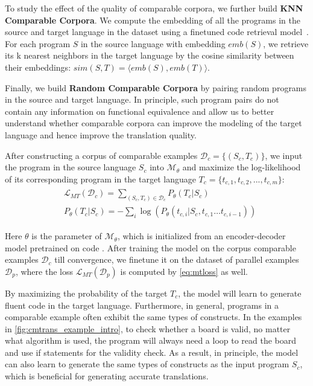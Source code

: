 To study the effect of the quality of comparable corpora, we further build \textbf{KNN Comparable Corpora}.
We compute the embedding of all the programs in the source and target language in the dataset using a finetuned code retrieval model~\cite{codesearchnet}.
For each program $S$ in the source language with embedding $emb(S)$, we retrieve its k nearest neighbors in the target language by the cosine similarity between their embeddings: $sim(S,T) = \langle emb(S), emb(T) \rangle$.

Finally, we build \textbf{Random Comparable Corpora} by pairing random programs in the source and target language.
In principle, such program pairs do not contain any information on functional equivalence and allow us to better understand whether comparable corpora can improve the modeling of the target language and hence improve the translation quality.



After constructing a corpus of comparable examples $\mathcal{D}_c = \{(S_c, T_c)\}$, we input the program in the source language $S_c$ into \cmtransours $\mathcal{M}_{\theta}$ and maximize the log-likelihood of its corresponding program in the target language $T_c = \{t_{c,1}, t_{c,2}, ..., t_{c,m} \}$:
\begin{align}
\begin{split}
&\mathcal{L}_{M T}(\mathcal{D}_c) = \sum_{(S_c, T_c) \in \mathcal{D}_c} P_{\theta}(T_c | S_c) \\
&P_{\theta}(T_c | S_c) = -\sum_i \log \left(P_{\theta}\left(t_{c,i} | S_c, t_{c,1} \ldots t_{c,i-1} \right)\right)
\end{split}
\label{eq:mtloss}
\end{align}

Here $\theta$ is the parameter of $\mathcal{M}_{\theta}$, which is initialized from an encoder-decoder model pretrained on code \cite{codet5}.
After training the model on the corpus comparable examples $\mathcal{D}_c$ till convergence, we finetune it on the dataset of parallel examples $\mathcal{D}_p$, where the loss $\mathcal{L}_{M T}(\mathcal{D}_p)$ is computed by \autoref{eq:mtloss} as well.

By maximizing the probability of the target $T_c$, the model will learn to generate fluent code in the target language.
Furthermore, in general, programs in a comparable example often exhibit the same types of constructs.
In the examples in \autoref{fig:cmtrans_example_intro}, to check whether a board is valid, no matter what algorithm is used, the program will always need a loop to read the board and use if statements for the validity check.
As a result, in principle, the model can also learn to generate the same types of constructs as the input program $S_c$, which is beneficial for generating accurate translations.


